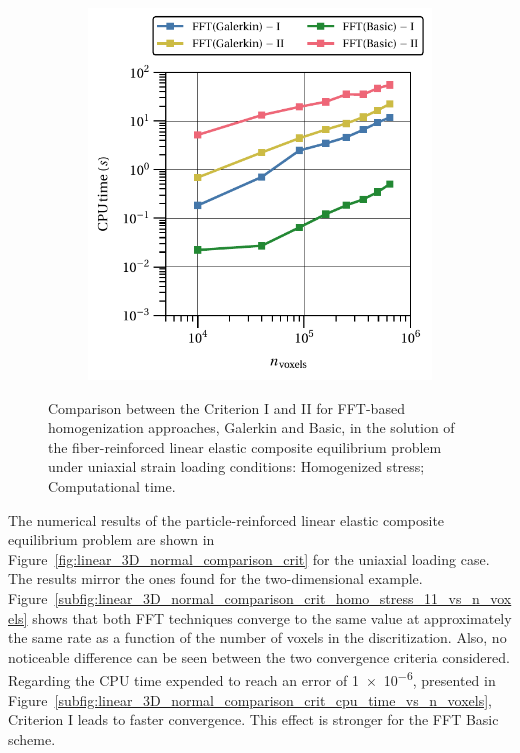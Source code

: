 \begin{figure}[hbt]
\begin{subfigure}[b]{0.48\textwidth}
    \includegraphics[width=\textwidth]{figures/linear_2D_normal_comparison_crit_cpu_time_vs_n_voxels}
    \caption{}
    \label{subfig:linear_2D_normal_comparison_crit_cpu_time_vs_n_voxels}
  \end{subfigure}
\caption{Comparison between the Criterion I and II for FFT-based homogenization approaches, Galerkin and Basic, in the
solution of the fiber-reinforced linear elastic composite equilibrium problem under uniaxial
strain loading conditions:  Homogenized stress;  Computational time.}
\label{fig:linear_2D_normal_comparison_crit}
\end{figure}

The numerical results of the particle-reinforced linear elastic composite equilibrium problem are shown in Figure~\ref{fig:linear_3D_normal_comparison_crit} for the uniaxial loading case.
The results mirror the ones found for the two-dimensional example.
Figure~\ref{subfig:linear_3D_normal_comparison_crit_homo_stress_11_vs_n_voxels} shows that both FFT techniques converge to the same value at approximately the same rate as a function of the number of voxels in the discritization.
Also, no noticeable difference can be seen between the two convergence criteria considered.
Regarding the CPU time expended to reach an error of \num{1e-6}, presented in Figure~\ref{subfig:linear_3D_normal_comparison_crit_cpu_time_vs_n_voxels}, Criterion I leads to faster convergence.
This effect is stronger for the FFT Basic scheme.

